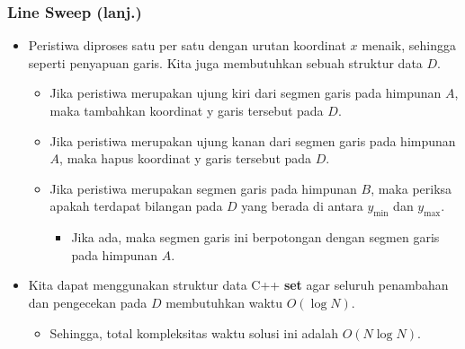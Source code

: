 \begin{frame}[fragile]
\frametitle{Line Sweep (lanj.)}
\begin{itemize}
  \item Peristiwa diproses satu per satu dengan urutan koordinat $x$ menaik, sehingga seperti penyapuan garis. Kita juga membutuhkan sebuah struktur data $D$.
  \begin{itemize}
    \item Jika peristiwa merupakan ujung kiri dari segmen garis pada himpunan $A$, maka tambahkan koordinat y garis tersebut pada $D$.
    \item Jika peristiwa merupakan ujung kanan dari segmen garis pada himpunan $A$, maka hapus koordinat y garis tersebut pada $D$.
    \item Jika peristiwa merupakan segmen garis pada himpunan $B$, maka periksa apakah terdapat bilangan pada $D$ yang berada di antara $y_{\min}$ dan $y_{\max}$.
    \begin{itemize}
      \item Jika ada, maka segmen garis ini berpotongan dengan segmen garis pada himpunan $A$.
    \end{itemize}
  \end{itemize}
  \item Kita dapat menggunakan struktur data C++ \textbf{set} agar seluruh penambahan dan pengecekan pada $D$ membutuhkan waktu $O(\log N)$.
  \begin{itemize}
    \item Sehingga, total kompleksitas waktu solusi ini adalah $O(N \log N)$.
  \end{itemize}
\end{itemize}
\end{frame}


